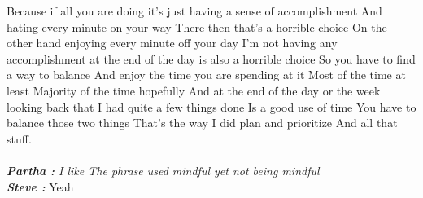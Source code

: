 \documentclass[a4paper, 12pt]{article}
\begin{document}
\begin{flushleft}
        Because if all you are doing it's just having a sense of accomplishment And hating every minute on your way There then that's a horrible choice On the other hand enjoying every minute off your day I'm not having any accomplishment at the end of the day is also a horrible choice So you have to find a way to balance And enjoy the time you are spending at it Most of the time at least Majority of the time hopefully And at the end of the day or the week looking back that I had quite a few things done Is a good use of time You have to balance those two  things That's the way I did plan and prioritize And all that stuff. \\~\\

        \textit {\textbf {Partha :} I like The phrase used mindful yet not being mindful} \\
        \textit {\textbf {Steve :}} Yeah


\end{flushleft}
\end{document}
